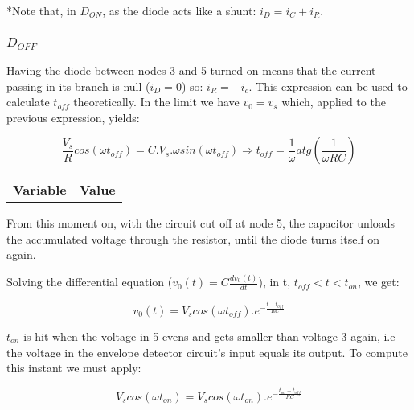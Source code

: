 *Note that, in $D_{ON}$, as the diode acts like a shunt: $i_D = i_C + i_R$.

\subsubsection{$D_{OFF}$}

Having the diode between nodes 3 and 5 turned on means that the current passing in its branch is null ($i_D = 0 $) so: $i_R = -i_c$. This expression can be used to calculate $t_{off}$ theoretically. In the limit we have $v_0 = v_s$ which, applied to the previous expression, yields:


\begin{center}
\begin{equation}
	\frac{V_{s}}{R} cos(\omega t_{off}) = C.V_s.\omega sin(\omega t_{off}) \Rightarrow t_{off} = \frac{1}{\omega} atg(\frac{1}{\omega RC})
\end{equation}
\end{center}

\begin{tabular}{|l|r|}
  \hline    
  {\bf Variable} & {\bf Value} \\ %
\end{tabular}

From this moment on, with the circuit cut off at node 5, the capacitor unloads the accumulated voltage through the resistor, until the diode turns itself on again.\par

Solving the differential equation ($v_0(t) = C\frac{dv_0(t)}{dt}$), in t, $t_{off} < t < t_{on}$, we get:

\begin{center}
\begin{equation}
	v_0(t) = V_s cos(\omega t_{off}).e^{-\frac{ t-t_{off} }{RC}}
\end{equation}
\end{center}


$t_{on}$ is hit when the voltage in 5 evens and gets smaller than voltage 3 again, i.e the voltage in the envelope detector circuit's input equals its output. To compute this instant we must apply:

\begin{center}
\begin{equation}
	 V_s cos(\omega t_{on}) = V_s cos(\omega t_{on}).e^{-\frac{ t_{on}-t_{off} }{RC}}
\end{equation}
\end{center}

